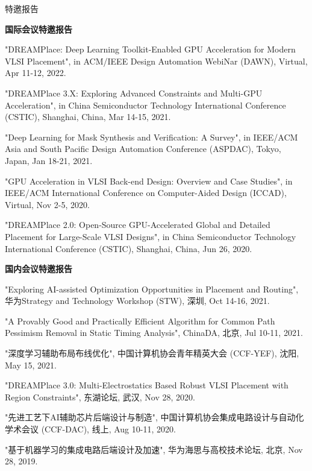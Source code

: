 \begin{rSection}{特邀报告}


\textbf{国际会议特邀报告}
        
\begin{description}[font=\normalfont]

\item[{[T5]}]{
"DREAMPlace: Deep Learning Toolkit-Enabled GPU Acceleration for Modern VLSI Placement", in ACM/IEEE Design Automation WebiNar (DAWN), Virtual, Apr 11-12, 2022. 
}

\item[{[T4]}]{
"DREAMPlace 3.X: Exploring Advanced Constraints and Multi-GPU Acceleration", in China Semiconductor Technology International Conference (CSTIC), Shanghai, China, Mar 14-15, 2021. 
}

\item[{[T3]}]{
"Deep Learning for Mask Synthesis and Verification: A Survey", in IEEE/ACM Asia and South Pacific Design Automation Conference (ASPDAC), Tokyo, Japan, Jan 18-21, 2021.
}

\item[{[T2]}]{
"GPU Acceleration in VLSI Back-end Design: Overview and Case Studies", in IEEE/ACM International Conference on Computer-Aided Design (ICCAD), Virtual, Nov 2-5, 2020. 
}

\item[{[T1]}]{
"DREAMPlace 2.0: Open-Source GPU-Accelerated Global and Detailed Placement for Large-Scale VLSI Designs", in China Semiconductor Technology International Conference (CSTIC), Shanghai, China, Jun 26, 2020. 
}

\end{description}


\textbf{国内会议特邀报告}
        
\begin{description}[font=\normalfont]

\item[{[T6]}]{
"Exploring AI-assisted Optimization Opportunities in Placement and Routing", 华为Strategy and Technology Workshop (STW), 深圳, Oct 14-16, 2021. 
}

\item[{[T5]}]{
"A Provably Good and Practically Efficient Algorithm for Common Path Pessimism Removal in Static Timing Analysis", ChinaDA, 北京, Jul 10-11, 2021. 
}

\item[{[T4]}]{
"深度学习辅助布局布线优化", 中国计算机协会青年精英大会 (CCF-YEF), 沈阳, May 15, 2021. 
}

\item[{[T3]}]{
"DREAMPlace 3.0: Multi-Electrostatics Based Robust VLSI Placement with Region Constraints", 东湖论坛, 武汉, Nov 28, 2020.
}

\item[{[T2]}]{
"先进工艺下AI辅助芯片后端设计与制造", 中国计算机协会集成电路设计与自动化学术会议 (CCF-DAC), 线上, Aug 10-11, 2020. 
}

\item[{[T1]}]{
"基于机器学习的集成电路后端设计及加速", 华为海思与高校技术论坛, 北京, Nov 28, 2019. 
}

\end{description}
\end{rSection}
